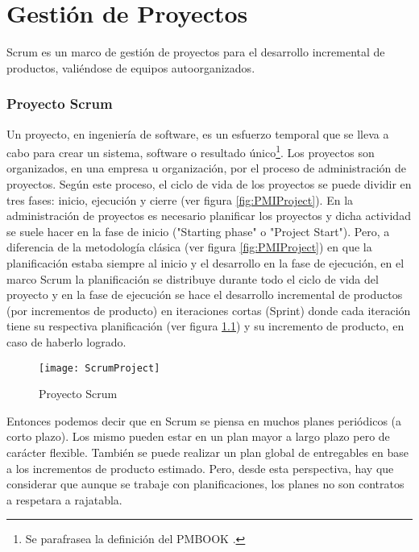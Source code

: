 \chapter{Gestión de Proyectos}

Scrum es un marco de gestión de proyectos para el desarrollo incremental de productos, valiéndose de equipos autoorganizados. 



\subsection{Proyecto Scrum}

Un proyecto, en ingeniería de software, es un esfuerzo temporal que se lleva a cabo para crear un sistema, software o resultado único\footnote{Se parafrasea la definición del PMBOOK \cite{PMBOK-2004}.}. Los proyectos son organizados, en una empresa u organización, por el proceso de administración de proyectos. Según este proceso, el ciclo de vida de los proyectos se puede dividir en tres fases: inicio, ejecución y cierre (ver figura \ref{fig:PMIProject}). En la administración de proyectos es necesario planificar los proyectos y dicha actividad se suele hacer en la fase de inicio ("Starting phase" o "Project Start"). Pero, a diferencia de la metodología clásica (ver figura \ref{fig:PMIProject}) en que la planificación estaba siempre al inicio y el desarrollo en la fase de ejecución, en el marco Scrum la planificación se distribuye durante todo el ciclo de vida del proyecto y en la fase de ejecución se hace el desarrollo incremental de productos (por incrementos de producto) en iteraciones cortas (Sprint) donde cada iteración tiene su respectiva planificación (ver figura \ref{fig:ScrumProject}) y su incremento de producto, en caso de haberlo logrado.

\begin{figure}[h]
  \centering
  \texttt{[image: ScrumProject]}
  \caption{Proyecto Scrum}
  \centering
  \label{fig:ScrumProject} %
\end{figure}

Entonces podemos decir que en Scrum se piensa en muchos planes periódicos (a corto plazo). Los mismo pueden estar en un plan mayor a largo plazo pero de carácter flexible. También se puede realizar un plan global de entregables en base a los incrementos de producto estimado. Pero, desde esta perspectiva, hay que considerar que aunque se trabaje con planificaciones, los planes no son contratos a respetara a rajatabla.

